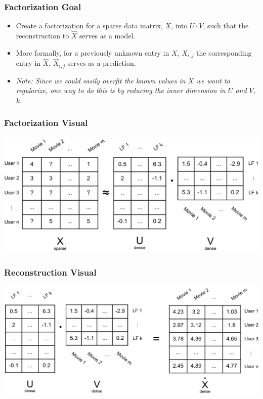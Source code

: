 \documentclass{beamer}
\begin{document}
\begin{frame}
  \frametitle{Factorization Goal}
  \begin{itemize}
    \item Create a factorization for a sparse data matrix, $X$, into $U \cdot V$, such that the reconstruction to $\hat{X}$ serves as a model. \vspace{2mm}
    \item More formally, for a previously unknown entry in $X$, $X_{i,j}$ the corresponding entry in $\hat{X}$, $\hat{X}_{i,j}$ serves as a prediction. \vspace{2mm}
    \item \textit{Note: Since we could easily overfit the known values in $X$ we want to regularize, one way to do this is by reducing the inner dimension in $U$ and $V$, $k$.}
  \end{itemize}
\end{frame}

\begin{frame}
  \frametitle{Factorization Visual}
  \includegraphics[width=\textwidth]{images/factorization.png} \vspace{4mm}
\end{frame}

\begin{frame}
  \frametitle{Reconstruction Visual}
  \includegraphics[width=\textwidth]{images/reconstruction.png} \vspace{4mm}
\end{frame}
\end{document}
